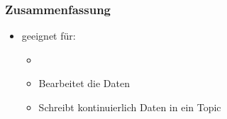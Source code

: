 \begin{frame}
\frametitle{Zusammenfassung}



\begin{itemize}
	\item geeignet für:
	\begin{itemize}
		\item   %
		\item Bearbeitet die Daten %
		\item Schreibt kontinuierlich Daten in ein Topic %
	\end{itemize}
\end{itemize}

\end{frame}